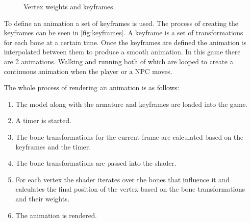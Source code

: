 \begin{figure}[H]
    \caption{Vertex weights and keyframes.}
\end{figure}

To define an animation a set of keyframes is used.
The process of creating the keyframes can be seen in \autoref{fig:keyframes}.
A keyframe is a set of transformations for each bone at a certain time.
Once the keyframes are defined the animation is interpolated between them to produce a smooth animation.
In this game there are 2 animations.
Walking and running both of which are looped to create a continuous animation when the player or a NPC moves.


The whole process of rendering an animation is as follows:
\begin{enumerate}
    \item The model along with the armature and keyframes are loaded into the game.
    \item A timer is started.
    \item The bone transformations for the current frame are calculated based on the keyframes and the timer.
    \item The bone transformations are passed into the shader.
    \item For each vertex the shader iterates over the bones that influence it and calculates the final position of the vertex based on the bone transformations and their weights.
    \item The animation is rendered.
\end{enumerate}